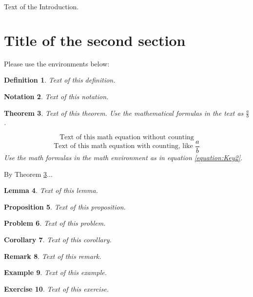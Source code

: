 \documentclass[a4paper,12pt]{article}
\newtheorem{theorem}{Theorem}[section]
\newtheorem{definition}[theorem]{Definition}
\newtheorem{notation}[theorem]{Notation}
\newtheorem{lemma}[theorem]{Lemma}
\newtheorem{proposition}[theorem]{Proposition}%
\newtheorem{problem}[theorem]{Problem}%
\newtheorem{corollary}[theorem]{Corollary}%
\newtheorem{remark}[theorem]{Remark}%
\newtheorem{example}[theorem]{Example}%
\newtheorem{exercise}[theorem]{Exercise}%
\begin{document}
Text of the Introduction.

\section{Title of the second section}

Please use the environments below:

\begin{definition}
Text of this definition.
\end{definition}

\begin{notation}
Text of this notation.
\end{notation}

\begin{theorem}\label{theorem:Key1}
Text of this theorem. Use the mathematical formulas in the text as $\frac{a}{b}$. 
\par 
\[
\text{Text of this math equation without counting}
\]
\begin{equation}\label{equation:Key2}
\text{Text of this math equation with counting, like } \dfrac{a}{b}
\end{equation}
Use the math formulas in the math environment as in equation \ref{equation:Key2}. 
\end{theorem}

\par By Theorem \ref{theorem:Key1}...

\begin{lemma}
Text of this lemma.
\end{lemma}

\begin{proposition}
Text of this proposition.
\end{proposition}

\begin{problem}
Text of this problem.
\end{problem}

\begin{corollary}
Text of this corollary.
\end{corollary}

\begin{remark}
Text of this remark.
\end{remark}

\begin{example}
Text of this example.
\end{example}

\begin{exercise}
Text of this exercise.
\end{exercise}
\end{document}
